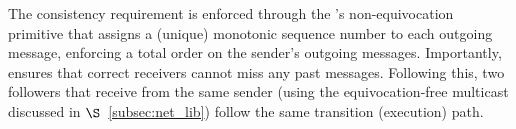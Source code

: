 The consistency requirement is enforced through the \projecttitle{}'s non-equivocation primitive that assigns a (unique) monotonic sequence number to each outgoing message, enforcing a total order on the sender's outgoing messages. 
Importantly, \projecttitle{} ensures that correct receivers cannot miss any past messages. Following this, two followers that receive from the same sender (using the equivocation-free multicast discussed in $\S$~\ref{subsec:net_lib}) follow the same transition (execution) path. 



